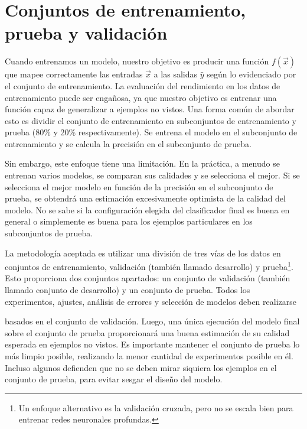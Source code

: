 \section{Conjuntos de entrenamiento, prueba y validación}
Cuando entrenamos un modelo, nuestro objetivo es producir una función $f(\vec{x})$ que mapee correctamente las entradas $\vec{x}$ a las salidas $\hat{y}$ según lo evidenciado por el conjunto de entrenamiento. La evaluación del rendimiento en los datos de entrenamiento puede ser engañosa, ya que nuestro objetivo es entrenar una función capaz de generalizar a ejemplos no vistos. Una forma común de abordar esto es dividir el conjunto de entrenamiento en subconjuntos de entrenamiento y prueba (80\% y 20\% respectivamente). Se entrena el modelo en el subconjunto de entrenamiento y se calcula la precisión en el subconjunto de prueba.

Sin embargo, este enfoque tiene una limitación. En la práctica, a menudo se entrenan varios modelos, se comparan sus calidades y se selecciona el mejor. Si se selecciona el mejor modelo en función de la precisión en el subconjunto de prueba, se obtendrá una estimación excesivamente optimista de la calidad del modelo. No se sabe si la configuración elegida del clasificador final es buena en general o simplemente es buena para los ejemplos particulares en los subconjuntos de prueba.

La metodología aceptada es utilizar una división de tres vías de los datos en conjuntos de entrenamiento, validación (también llamado desarrollo) y prueba\footnote{Un enfoque alternativo es la validación cruzada, pero no se escala bien para entrenar redes neuronales profundas.}. Esto proporciona dos conjuntos apartados: un conjunto de validación (también llamado conjunto de desarrollo) y un conjunto de prueba. Todos los experimentos, ajustes, análisis de errores y selección de modelos deben realizarse

basados en el conjunto de validación. Luego, una única ejecución del modelo final sobre el conjunto de prueba proporcionará una buena estimación de su calidad esperada en ejemplos no vistos. Es importante mantener el conjunto de prueba lo más limpio posible, realizando la menor cantidad de experimentos posible en él. Incluso algunos defienden que no se deben mirar siquiera los ejemplos en el conjunto de prueba, para evitar sesgar el diseño del modelo.

